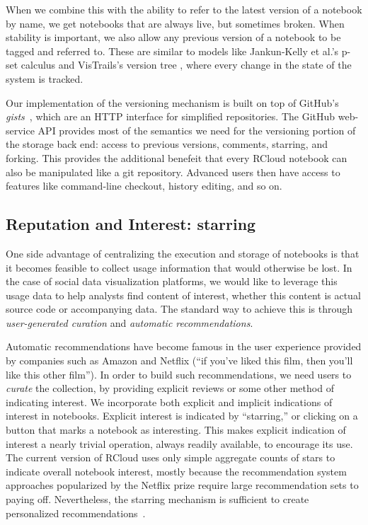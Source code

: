 When we combine this with the ability to refer to the latest version
of a notebook by name, we get notebooks that are always live, but
sometimes broken. When stability is important, we also
allow any previous version of a notebook to be tagged and referred
to. These are similar to models like Jankun-Kelly et al.'s p-set calculus
\cite{Jankun-Kelly:2007:MFV} and VisTrails's version tree
\cite{Callahan:2006:VVM}, where every change in the state of the
system is tracked.

Our implementation of the versioning mechanism is built on
top of GitHub's \emph{gists}~\cite{GitHub:2014:GG}, which are an HTTP
interface for simplified repositories. The GitHub web-service API
provides most of the semantics we need for the versioning portion of
the storage back end: access to previous versions, comments, starring,
and forking. This provides the additional benefeit that every RCloud
notebook can also be manipulated like a git repository. Advanced users
then have access to features like command-line checkout, history
editing, and so on.

\subsection{Reputation and Interest: starring\label{sec:starring}}

One side advantage of centralizing the execution and storage of
notebooks is that it becomes feasible to collect usage information
that would otherwise be lost. In the case of social data visualization
platforms, we would like to leverage this usage data to help analysts
find content of interest, whether this content is actual source code
or accompanying data. The standard way to achieve this is through
\emph{user-generated curation} and \emph{automatic recommendations}.

Automatic recommendations have become famous in the user experience
provided by companies such as Amazon and Netflix (``if you've liked
this film, then you'll like this other film''). In order to build such
recommendations, we need users to \emph{curate} the collection, by
providing explicit reviews or some other method of indicating interest.
We incorporate both explicit and implicit indications of interest
in notebooks. Explicit interest is indicated by ``starring,'' or
clicking on a button that marks a notebook as interesting.
This makes explicit indication of interest a nearly trivial operation,
always readily available, to encourage its use.
%
The current version of RCloud uses only simple aggregate counts of
stars to indicate overall notebook interest, mostly because the
recommendation system approaches popularized by the Netflix prize
require large recommendation sets to paying off. Nevertheless, the
starring mechanism is sufficient to create personalized
recommendations~\cite{Hu:2008:CFF}.

